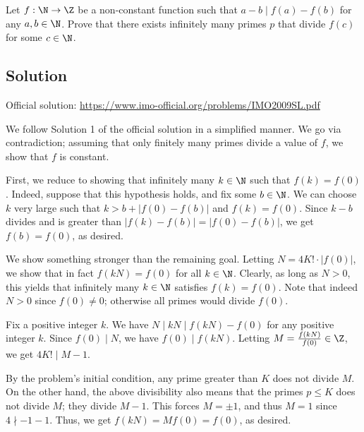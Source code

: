 Let $f : \N \to \Z$ be a non-constant function such that $a - b \mid f(a) - f(b)$ for any $a, b \in \N$.
Prove that there exists infinitely many primes $p$ that divide $f(c)$ for some $c \in \N$.



\subsection*{Solution}

Official solution: \url{https://www.imo-official.org/problems/IMO2009SL.pdf}

We follow Solution 1 of the official solution in a simplified manner.
We go via contradiction; assuming that only finitely many primes divide a value of $f$, we show that $f$ is constant.

First, we reduce to showing that infinitely many $k \in \N$ such that $f(k) = f(0)$.
Indeed, suppose that this hypothesis holds, and fix some $b \in \N$.
We can choose $k$ very large such that $k > b + |f(0) - f(b)|$ and $f(k) = f(0)$.
Since $k - b$ divides and is greater than $|f(k) - f(b)| = |f(0) - f(b)|$, we get $f(b) = f(0)$, as desired.

We show something stronger than the remaining goal.
Letting $N = 4K! \cdot |f(0)|$, we show that in fact $f(kN) = f(0)$ for all $k \in \N$.
Clearly, as long as $N > 0$, this yields that infinitely many $k \in \N$ satisfies $f(k) = f(0)$.
Note that indeed $N > 0$ since $f(0) \neq 0$; otherwise all primes would divide $f(0)$.

Fix a positive integer $k$.
We have $N \mid kN \mid f(kN) - f(0)$ for any positive integer $k$.
Since $f(0) \mid N$, we have $f(0) \mid f(kN)$.
Letting $M = \frac{f(kN)}{f(0)} \in \Z$, we get $4K! \mid M - 1$.

By the problem's initial condition, any prime greater than $K$ does not divide $M$.
On the other hand, the above divisibility also means that the primes $p \leq K$ does not divide $M$; they divide $M - 1$.
This forces $M = \pm 1$, and thus $M = 1$ since $4 \nmid -1 - 1$.
Thus, we get $f(kN) = M f(0) = f(0)$, as desired.
